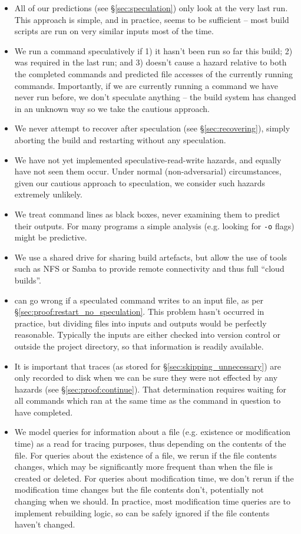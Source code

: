 \begin{itemize}
\item All of our predictions (see \S\ref{sec:speculation}) only look at the very last run. This approach is simple, and in practice, seems to be sufficient -- most build scripts are run on very similar inputs most of the time.
\item We run a command speculatively if 1) it hasn't been run so far this build; 2) was required in the last run; and 3) doesn't cause a hazard relative to both the completed commands and predicted file accesses of the currently running commands. Importantly, if we are currently running a command we have never run before, we don't speculate anything -- the build system has changed in an unknown way so we take the cautious approach.
\item We never attempt to recover after speculation (see \S\ref{sec:recovering}), simply aborting the build and restarting without any speculation.
\item We have not yet implemented speculative-read-write hazards, and equally have not seen them occur. Under normal (non-adversarial) circumstances, given our cautious approach to speculation, we consider such hazards extremely unlikely.
\item We treat command lines as black boxes, never examining them to predict their outputs. For many programs a simple analysis (e.g. looking for \texttt{-o} flags) might be predictive.
\item We use a shared drive for sharing build artefacts, but allow the use of tools such as NFS or Samba to provide remote connectivity and thus full ``cloud builds''.
\item \Rattle can go wrong if a speculated command writes to an input file, as per \S\ref{sec:proof:restart_no_speculation}. This problem hasn't occurred in practice, but dividing files into inputs and outputs would be perfectly reasonable. Typically the inputs are either checked into version control or outside the project directory, so that information is readily available.
\item It is important that traces (as stored for \S\ref{sec:skipping_unnecessary}) are only recorded to disk when we can be sure they were not effected by any hazards (see \S\ref{sec:proof:continue}). That determination requires waiting for all commands which ran at the same time as the command in question to have completed.
\item We model queries for information about a file (e.g. existence or modification time) as a read for tracing purposes, thus depending on the contents of the file. For queries about the existence of a file, we rerun if the file contents changes, which may be significantly more frequent than when the file is created or deleted. For queries about modification time, we don't rerun if the modification time changes but the file contents don't, potentially not changing when we should. In practice, most modification time queries are to implement rebuilding logic, so can be safely ignored if the file contents haven't changed.

\end{itemize}

